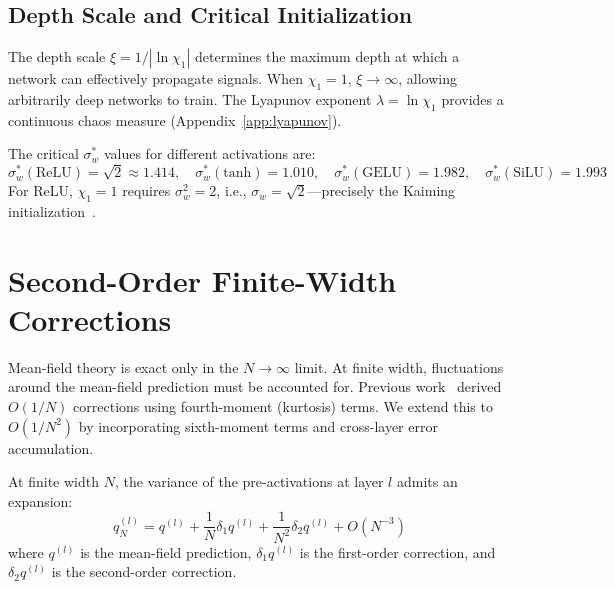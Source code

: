\documentclass[10pt]{article}
\begin{document}
\subsection{Depth Scale and Critical Initialization}

The depth scale $\xi = 1/|\ln \chi_1|$ determines the maximum depth at which a network can effectively propagate signals.
When $\chi_1 = 1$, $\xi \to \infty$, allowing arbitrarily deep networks to train.
The Lyapunov exponent $\lambda = \ln\chi_1$ provides a continuous chaos measure (Appendix~\ref{app:lyapunov}).

The critical $\sigma_w^*$ values for different activations are:
\begin{equation}
    \sigma_w^*(\text{ReLU}) = \sqrt{2} \approx 1.414, \quad
    \sigma_w^*(\text{tanh}) = 1.010, \quad
    \sigma_w^*(\text{GELU}) = 1.982, \quad
    \sigma_w^*(\text{SiLU}) = 1.993
    \label{eq:eoc-values}
\end{equation}
For ReLU, $\chi_1 = 1$ requires $\sigma_w^2 = 2$, i.e., $\sigma_w = \sqrt{2}$---precisely the Kaiming initialization~\cite{he2015delving}.

\section{Second-Order Finite-Width Corrections}
\label{sec:finite-width}

Mean-field theory is exact only in the $N \to \infty$ limit.
At finite width, fluctuations around the mean-field prediction must be accounted for.
Previous work~\cite{hanin2018neural} derived $O(1/N)$ corrections using fourth-moment (kurtosis) terms.
We extend this to $O(1/N^2)$ by incorporating sixth-moment terms and cross-layer error accumulation.

At finite width $N$, the variance of the pre-activations at layer $l$ admits an expansion:
\begin{equation}
    q_N^{(l)} = q^{(l)} + \frac{1}{N} \delta_1 q^{(l)} + \frac{1}{N^2} \delta_2 q^{(l)} + O(N^{-3})
    \label{eq:finite-width-expansion}
\end{equation}
where $q^{(l)}$ is the mean-field prediction, $\delta_1 q^{(l)}$ is the first-order correction, and $\delta_2 q^{(l)}$ is the second-order correction.
\end{document}
